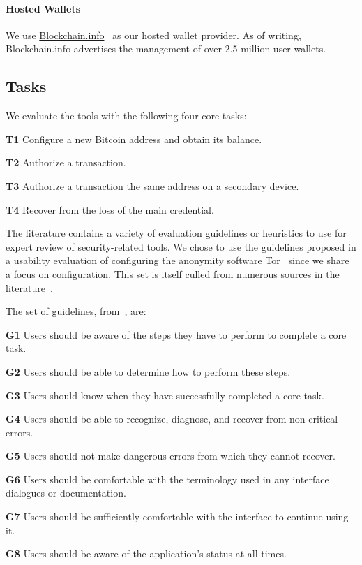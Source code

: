 \paragraph{Hosted Wallets} We use \url{Blockchain.info}~\cite{blockchain} as our hosted wallet provider. As of writing, Blockchain.info advertises the management of over 2.5 million user wallets.

\subsection{Tasks}
We evaluate the tools with the following four core tasks:

\begin{compactlist}
	\item[\bf T1] Configure a new Bitcoin address and obtain its balance.\label{sec:ct-1}
	\item[\bf T2] Authorize a transaction.\label{sec:ct-2}
	\item[\bf T3] Authorize a transaction the same address on a secondary device.\label{sec:ct-3}
	\item[\bf T4] Recover from the loss of the main credential.\label{sec:ct-4}
\end{compactlist}

The literature contains a variety of evaluation guidelines or heuristics to use for expert review of security-related tools. We chose to use the guidelines proposed in a usability evaluation of configuring the anonymity software Tor~\cite{COA07} since we share a focus on configuration. This set is itself culled from numerous sources in the literature~\cite{WRLP94,WT99,Cra03,KBK05,COB06}.

The set of guidelines, from~\cite{COA07}, are:
	
\begin{compactlist}
	\item[\bf G1] Users should be aware of the steps they have to perform to complete a core task.
	\item[\bf G2] Users should be able to determine how to perform these steps.
	\item[\bf G3] Users should know when they have successfully completed a core task.
	\item[\bf G4] Users should be able to recognize, diagnose, and recover from non-critical errors.
	\item[\bf G5] Users should not make dangerous errors from which they cannot recover.
	\item[\bf G6] Users should be comfortable with the terminology used in any interface dialogues or documentation.
	\item[\bf G7] Users should be sufficiently comfortable with the interface to continue using it.
	\item[\bf G8] Users should be aware of the application's status at all times.
\end{compactlist}

